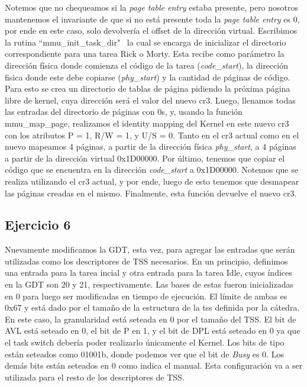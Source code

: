 \documentclass[a4paper]{article}
\begin{document}
\justify
Notemos que no chequeamos si la \textit{page table entry} estaba presente, pero nosotros mantenemos el invariante de que si no está presente toda la \textit{page table entry} es 0, por ende en este caso, solo devolvería el offset de la dirección virtual.
\justify
Escribimos la rutina ``mmu_init_task_dir" \, la cual se encarga de inicializar el directorio correspondiente para una tarea Rick o Morty. Esta recibe como parámetro la dirección física donde comienza el código de la tarea (\textit{code_start}), la dirección fisica donde este debe copiarse (\textit{phy_start}) y la cantidad de páginas de código.
Para esto se crea un directorio de tablas de página pidiendo la próxima página libre de kernel, cuya dirección será el valor del nuevo cr3. Luego, llenamos todas las entradas del directorio de páginas con 0s, y, usando la función mmu_map_page, realizamos el identity mapping del Kernel en este nuevo cr3 con los atributos P = 1, R/W = 1, y U/S = 0. Tanto en el cr3 actual como en el nuevo mapeamos 4 páginas, a partir de la dirección física \textit{phy_start}, a 4 páginas a partir de la dirección virtual 0x1D00000. Por último, tenemos que copiar el código que se encuentra en la dirección \textit{code_start} a 0x1D00000. Notemos que se realiza utilizando el cr3 actual, y por ende, luego de esto tenemos que desmapear las páginas creadas en el mismo. Finalmente, esta función devuelve el nuevo cr3.
 

\subsection{Ejercicio 6}

\justify
Nuevamente modificamos la GDT, esta vez, para agregar las entradas que serán utilizadas como los descriptores de TSS necesarios. En un principio, definimos una entrada para la tarea incial y otra entrada para la tarea Idle, cuyos índices en la GDT son 20 y 21, respectivamente. Las bases de estas fueron inicializadas en 0 para luego ser modificadas en tiempo de ejecución. El límite de ambas es 0x67 y está dado por el tamaño de la estructura de la tss definida por la cátedra. En este caso, la granularidad está seteada en 0 por el tamaño del TSS. El bit de AVL está seteado en 0, el bit de P en 1, y el bit de DPL está seteado en 0 ya que el task switch debería poder realizarlo únicamente el Kernel. Los bits de tipo están seteados como 01001b, donde podemos ver que el bit de \textit{Busy} es 0. Los demás bits están seteados en 0 como indica el manual. Esta configuración va a ser utilizada para el resto de los descriptores de TSS.
\end{document}
